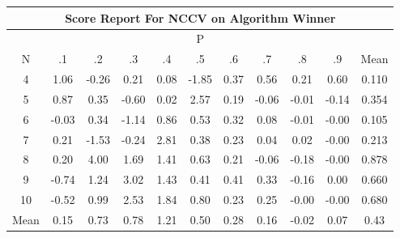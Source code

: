 \documentclass[11pt,a4paper]{report}
\begin{document}
\begin{longtable}{ | c || c | c | c | c | c | c | c | c | c || c |}
\hline
\multicolumn{11}{|c|}{ Score Report For NCCV on Algorithm Winner} \\
\hline
\multicolumn{11}{|c|}{ P } \\
\hline
N & .1 & .2 & .3 & .4 & .5 & .6 & .7 & .8 & .9 & Mean\\
 \hline
 \hline
 \endhead
  4 &  \cellcolor[HTML]{E7E7FF} 1.06 &  \cellcolor[HTML]{FFF7F7} -0.26 &  \cellcolor[HTML]{F7F7FF} 0.21 &  \cellcolor[HTML]{FFFFFF} 0.08 &  \cellcolor[HTML]{FFCFCF} -1.85 &  \cellcolor[HTML]{F7F7FF} 0.37 &  \cellcolor[HTML]{EFEFFF} 0.56 &  \cellcolor[HTML]{F7F7FF} 0.21 &  \cellcolor[HTML]{EFEFFF} 0.60 & 0.110 \\
  5 &  \cellcolor[HTML]{E7E7FF} 0.87 &  \cellcolor[HTML]{F7F7FF} 0.35 &  \cellcolor[HTML]{FFEFEF} -0.60 &  \cellcolor[HTML]{FFFFFF} 0.02 &  \cellcolor[HTML]{BFBFFF} 2.57 &  \cellcolor[HTML]{F7F7FF} 0.19 &  \cellcolor[HTML]{FFFFFF} -0.06 &  \cellcolor[HTML]{FFFFFF} -0.01 &  \cellcolor[HTML]{FFFFFF} -0.14 & 0.354 \\
  6 &  \cellcolor[HTML]{FFFFFF} -0.03 &  \cellcolor[HTML]{F7F7FF} 0.34 &  \cellcolor[HTML]{FFDFDF} -1.14 &  \cellcolor[HTML]{E7E7FF} 0.86 &  \cellcolor[HTML]{EFEFFF} 0.53 &  \cellcolor[HTML]{F7F7FF} 0.32 &  \cellcolor[HTML]{FFFFFF} 0.08 &  \cellcolor[HTML]{FFFFFF} -0.01 &  \cellcolor[HTML]{FFFFFF} -0.00 & 0.105 \\
  7 &  \cellcolor[HTML]{F7F7FF} 0.21 &  \cellcolor[HTML]{FFD7D7} -1.53 &  \cellcolor[HTML]{FFF7F7} -0.24 &  \cellcolor[HTML]{B7B7FF} 2.81 &  \cellcolor[HTML]{F7F7FF} 0.38 &  \cellcolor[HTML]{F7F7FF} 0.23 &  \cellcolor[HTML]{FFFFFF} 0.04 &  \cellcolor[HTML]{FFFFFF} 0.02 &  \cellcolor[HTML]{FFFFFF} -0.00 & 0.213 \\
  8 &  \cellcolor[HTML]{F7F7FF} 0.20 &  \cellcolor[HTML]{9797FF} 4.00 &  \cellcolor[HTML]{D7D7FF} 1.69 &  \cellcolor[HTML]{DFDFFF} 1.41 &  \cellcolor[HTML]{EFEFFF} 0.63 &  \cellcolor[HTML]{F7F7FF} 0.21 &  \cellcolor[HTML]{FFFFFF} -0.06 &  \cellcolor[HTML]{FFF7F7} -0.18 &  \cellcolor[HTML]{FFFFFF} -0.00 & 0.878 \\
  9 &  \cellcolor[HTML]{FFEFEF} -0.74 &  \cellcolor[HTML]{DFDFFF} 1.24 &  \cellcolor[HTML]{AFAFFF} 3.02 &  \cellcolor[HTML]{D7D7FF} 1.43 &  \cellcolor[HTML]{F7F7FF} 0.41 &  \cellcolor[HTML]{F7F7FF} 0.41 &  \cellcolor[HTML]{F7F7FF} 0.33 &  \cellcolor[HTML]{FFFFFF} -0.16 &  \cellcolor[HTML]{FFFFFF} 0.00 & 0.660 \\
  10 &  \cellcolor[HTML]{FFEFEF} -0.52 &  \cellcolor[HTML]{E7E7FF} 0.99 &  \cellcolor[HTML]{BFBFFF} 2.53 &  \cellcolor[HTML]{CFCFFF} 1.84 &  \cellcolor[HTML]{E7E7FF} 0.80 &  \cellcolor[HTML]{F7F7FF} 0.23 &  \cellcolor[HTML]{F7F7FF} 0.25 &  \cellcolor[HTML]{FFFFFF} -0.00 &  \cellcolor[HTML]{FFFFFF} -0.00 & 0.680 \\
 \hline
 \hline
Mean &  \cellcolor[HTML]{FFFFFF} 0.15 &  \cellcolor[HTML]{EFEFFF} 0.73 &  \cellcolor[HTML]{EFEFFF} 0.78 &  \cellcolor[HTML]{DFDFFF} 1.21 &  \cellcolor[HTML]{EFEFFF} 0.50 &  \cellcolor[HTML]{F7F7FF} 0.28 &  \cellcolor[HTML]{F7F7FF} 0.16 &  \cellcolor[HTML]{FFFFFF} -0.02 &  \cellcolor[HTML]{FFFFFF} 0.07 &  \cellcolor[HTML]{F7F7FF} 0.43
\end{longtable}
\end{document}
